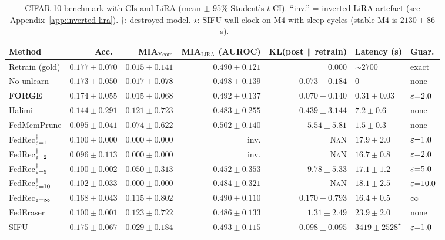 \begin{table}[t]
\centering
\scriptsize
\setlength{\tabcolsep}{3pt}
\begin{tabular}{lrrrrll}
\toprule
Method & Acc.\ & MIA$_{\mathrm{Yeom}}$ & MIA$_{\mathrm{LiRA}}$ (AUROC) & KL(post\,$\|$\,retrain) & Latency (s) & Guar. \\
\midrule
Retrain (gold)                             & $0.177 \pm 0.070$ & $0.015 \pm 0.141$ & $0.490 \pm 0.121$ & $0.000$                 & $\sim 2700$              & exact \\
No-unlearn                                 & $0.173 \pm 0.050$ & $0.017 \pm 0.078$ & $0.498 \pm 0.139$ & $0.073 \pm 0.184$       & $0$                      & none  \\
\textbf{FORGE}                             & $\mathbf{0.174 \pm 0.055}$ & $\mathbf{0.015 \pm 0.068}$ & $0.492 \pm 0.137$ & $\mathbf{0.070 \pm 0.140}$ & $\mathbf{0.31 \pm 0.03}$ & $\varepsilon{=}2.0$ \\
\midrule
Halimi \cite{halimi2022}                   & $0.144 \pm 0.291$ & $0.121 \pm 0.723$ & $0.483 \pm 0.255$ & $0.439 \pm 3.144$ & $7.2 \pm 0.6$   & none \\
FedMemPrune \cite{wei2026fedmemprune}      & $0.095 \pm 0.041$ & $0.074 \pm 0.622$ & $0.502 \pm 0.140$ & $5.54 \pm 5.81$   & $1.5 \pm 0.3$   & none \\
FedRec$^{\dag}_{\varepsilon{=}1}$                 & $0.100 \pm 0.000$ & $0.000 \pm 0.000$ & inv.              & \textsc{NaN}      & $17.9 \pm 2.0$  & $\varepsilon{=}1.0$ \\
FedRec$^{\dag}_{\varepsilon{=}2}$                 & $0.096 \pm 0.113$ & $0.000 \pm 0.000$ & inv.              & \textsc{NaN}      & $16.7 \pm 0.8$  & $\varepsilon{=}2.0$ \\
FedRec$^{\dag}_{\varepsilon{=}5}$                 & $0.100 \pm 0.002$ & $0.050 \pm 0.313$ & $0.452 \pm 0.353$ & $9.78 \pm 5.33$   & $17.1 \pm 1.2$  & $\varepsilon{=}5.0$ \\
FedRec$^{\dag}_{\varepsilon{=}10}$                & $0.102 \pm 0.033$ & $0.000 \pm 0.000$ & $0.484 \pm 0.321$ & \textsc{NaN}      & $18.1 \pm 2.5$  & $\varepsilon{=}10.0$ \\
FedRec$_{\varepsilon{=}\infty}$                   & $0.168 \pm 0.043$ & $\mathbf{0.115 \pm 0.802}$ & $0.490 \pm 0.110$ & $0.170 \pm 0.793$ & $16.4 \pm 0.5$ & $\infty$ \\
FedEraser \cite{liu2021federaser}          & $0.100 \pm 0.001$ & $0.123 \pm 0.722$ & $0.486 \pm 0.133$ & $1.31 \pm 2.49$   & $23.9 \pm 2.0$  & none \\
SIFU \cite{fraboni2024sifu}                & $0.175 \pm 0.067$ & $0.029 \pm 0.184$ & $0.493 \pm 0.115$ & $0.098 \pm 0.095$ & $3419 \pm 2528^{\star}$ & $\varepsilon{=}1.0$ \\
\bottomrule
\end{tabular}
\caption{CIFAR-10 benchmark with CIs and LiRA (mean $\pm$ 95\% Student's-$t$ CI). ``inv.'' = inverted-LiRA artefact (see Appendix~\ref{app:inverted-lira}). $\dag$: destroyed-model. $\star$: SIFU wall-clock on M4 with sleep cycles (stable-M4 is $2130 \pm 86$~s).}
\label{tab:cifar10-full}
\end{table}
